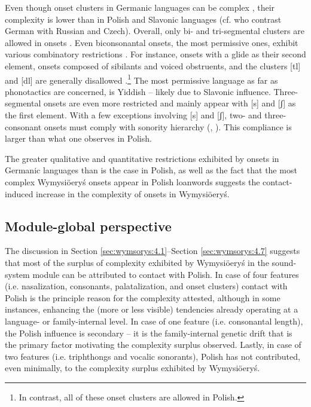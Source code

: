 \documentclass[output=paper,hidelinks]{langscibook}
\begin{document}
Even though onset clusters in Germanic languages can be complex \citep[33]{harbert_germanic_2007, van_oostendorp_germanic_2019}, their complexity is lower than in Polish and Slavonic languages (cf. \citealt{kucera_comparative_1968} who contrast German with Russian and Czech). Overall, only bi- and tri-segmental clusters are allowed in onsets \citep[34--36]{van_oostendorp_germanic_2019}. Even biconsonantal onsets, the most permissive ones, exhibit various combinatory restrictions \citep{harbert_germanic_2007, van_oostendorp_germanic_2019}. For instance, onsets with a glide as their second element, onsets composed of sibilants and voiced obstruents, and the clusters [tl] and [dl] are generally disallowed \citep{van_oostendorp_germanic_2019}.\footnote{In contrast, all of these onset clusters are allowed in Polish.} The most permissive language as far as phonotactics are concerned, is Yiddish \citep{van_oostendorp_germanic_2019} – likely due to Slavonic influence. Three-segmental onsets are even more restricted and mainly appear with [s] and [ʃ] as the first element. With a few exceptions involving [s] and [ʃ], two- and three-consonant onsets must comply with sonority hierarchy (\citealt[68, 73]{harbert_germanic_2007}, \citealt{van_oostendorp_germanic_2019}). This compliance is larger than what one observes in Polish.

The greater qualitative and quantitative restrictions exhibited by onsets in Germanic languages than is the case in Polish, as well as the fact that the most complex Wymysiöeryś onsets appear in Polish loanwords suggests the contact-induced increase in the complexity of onsets in Wymysiöeryś. 

\subsection{Module-global perspective}\label{sec:wymsorys:4.8}

The discussion in Section \ref{sec:wymsorys:4.1}--Section \ref{sec:wymsorys:4.7} suggests that most of the surplus of complexity exhibited by Wymysiöeryś in the sound-system module can be attributed to contact with Polish. In case of four features (i.e. nasalization, consonants, palatalization, and onset clusters) contact with Polish is the principle reason for the complexity attested, although in some instances, enhancing the (more or less visible) tendencies already operating at a language- or family-internal level. In case of one feature (i.e. consonantal length), the Polish influence is secondary – it is the family-internal genetic drift that is the primary factor motivating the complexity surplus observed. Lastly, in case of two features (i.e. triphthongs and vocalic sonorants), Polish has not contributed, even minimally, to the complexity surplus exhibited by Wymysiöeryś.
\end{document}
